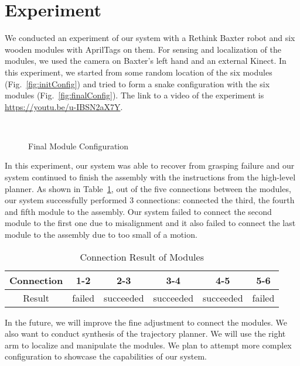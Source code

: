 \section{Experiment}

We conducted an experiment of our system with a Rethink Baxter robot and six wooden modules with AprilTags on them. For sensing and localization of the modules, we used the camera on Baxter's left hand and an external Kinect. In this experiment, we started from some random location of the six modules (Fig.~\ref{fig:initConfig}) and tried to form a snake configuration with the six modules (Fig.~\ref{fig:finalConfig}).
The link to a video of the experiment is \url{https://youtu.be/u-IBSN2aX7Y}. 

\begin{figure}[ht!]%
\centering
{}
\quad
{}\\
\caption{Final Module Configuration}
\end{figure}

In this experiment, our system was able to recover from grasping failure and our system continued to finish the assembly with the instructions from the high-level planner. As shown in Table~\ref{table:result}, out of the five connections between the modules, our system successfully performed 3 connections: connected the third, the fourth and fifth module to the assembly. Our system failed to connect the second module to the first one due to misalignment and it also failed to connect the last module to the assembly due to too small of a motion. 


\begin{table}[h]
\caption{Connection Result of Modules} %
\begin{tabular}{|c |c |c |c |c |c|}
\hline
 Connection &  1-2 & 2-3 & 3-4 & 4-5 & 5-6 \\\hline 
  Result  & failed & succeeded & succeeded & succeeded & failed \\\hline  
\end{tabular}\label{table:result}
\end{table}

In the future, we will improve the fine adjustment to connect the modules. We also want to conduct synthesis of the trajectory planner. We will use the right arm to localize and manipulate the modules. We plan to attempt more complex configuration to showcase the capabilities of our system.


